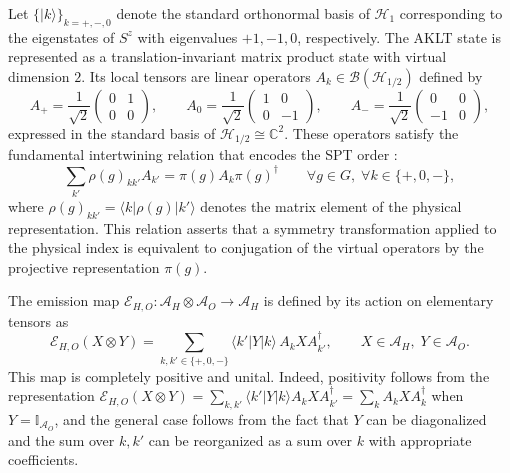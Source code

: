 \documentclass[12pt,a4paper]{article}
\begin{document}
Let $\{|k\rangle\}_{k=+,-,0}$ denote the standard orthonormal basis of $\mathcal{H}_1$ corresponding to the eigenstates of $S^z$ with eigenvalues $+1, -1, 0$, respectively. The AKLT state is represented as a translation-invariant matrix product state with virtual dimension $2$. Its local tensors are linear operators $A_k \in \mathcal{B}(\mathcal{H}_{1/2})$ defined by
\[
A_+ = \frac{1}{\sqrt{2}} \begin{pmatrix} 0 & 1 \\ 0 & 0 \end{pmatrix},\qquad
A_0 = \frac{1}{\sqrt{2}} \begin{pmatrix} 1 & 0 \\ 0 & -1 \end{pmatrix},\qquad
A_- = \frac{1}{\sqrt{2}} \begin{pmatrix} 0 & 0 \\ -1 & 0 \end{pmatrix},
\]
expressed in the standard basis of $\mathcal{H}_{1/2} \cong \mathbb{C}^2$. These operators satisfy the fundamental intertwining relation that encodes the SPT order \cite{Pollmann2010}:
\begin{equation}
\sum_{k'} \rho(g)_{k k'} A_{k'} = \pi(g) A_k \pi(g)^\dagger \qquad \forall g \in G,\; \forall k \in \{+,0,-\},
\label{eq:aklt_covariance}
\end{equation}
where $\rho(g)_{kk'} = \langle k | \rho(g) | k' \rangle$ denotes the matrix element of the physical representation. This relation asserts that a symmetry transformation applied to the physical index is equivalent to conjugation of the virtual operators by the projective representation $\pi(g)$.

The emission map $\mathcal{E}_{H,O}: \mathcal{A}_H \otimes \mathcal{A}_O \to \mathcal{A}_H$ is defined by its action on elementary tensors as
\begin{equation}
\mathcal{E}_{H,O}(X \otimes Y) = \sum_{k,k' \in \{+,0,-\}} \langle k' | Y | k \rangle \, A_k X A_{k'}^\dagger, \qquad X \in \mathcal{A}_H,\; Y \in \mathcal{A}_O.
\label{eq:aklt_emission}
\end{equation}
This map is completely positive and unital. Indeed, positivity follows from the representation $\mathcal{E}_{H,O}(X \otimes Y) = \sum_{k,k'} \langle k'|Y|k\rangle A_k X A_{k'}^\dagger = \sum_{k} A_k X A_k^\dagger$ when $Y = \mathbb{I}_{\mathcal{A}_O}$, and the general case follows from the fact that $Y$ can be diagonalized and the sum over $k,k'$ can be reorganized as a sum over $k$ with appropriate coefficients.
\end{document}
